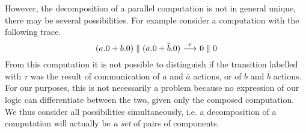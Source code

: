 %
However, the decomposition of a parallel computation 
is not in general unique, there may be several possibilities.
For example consider a computation with the following trace.
\[
     (a.0+b.0)\parallel(\bar{a}.0+\bar{b}.0) \ {\stackrel{{\tau}}{\longrightarrow}}\  0\parallel 0
\]
From this computation it is not possible to distinguish if the transition
labelled with $\tau$ was the result of communication of $a$ and $\bar a$ actions,
or of $b$ and $\bar b$ actions.
For our purposes, this is not necessarily a problem because no expression
of our logic can differentiate between the two, given only the composed
computation. We thus consider all possibilities simultaneously,
i.e. a decomposition of a computation will actually
be \emph{a set} of pairs of components.

